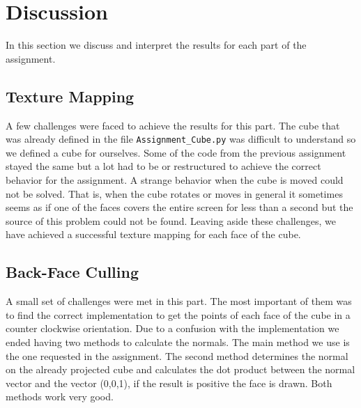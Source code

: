 \section{Discussion}
	In this section we discuss and interpret the results for each part of the assignment.
\subsection{Texture Mapping}
A few challenges were faced to achieve the results for this part. The cube that was already defined in the file \verb|Assignment_Cube.py| was difficult to understand so we defined a cube for ourselves. Some of the code from the previous assignment stayed the same but a lot had to be or restructured to achieve the correct behavior for the assignment. A strange behavior when the cube is moved could not be solved. That is, when the cube rotates or moves in general it sometimes seems as if one of the faces covers the entire screen for less than a second but the source of this problem could not be found. Leaving aside these challenges, we have achieved a successful texture mapping for each face of the cube.

\subsection{Back-Face Culling}
A small set of challenges were met in this part. The most important of them was to find the correct implementation to get the points of each face of the cube in a counter clockwise orientation. Due to a confusion with the implementation we ended having two methods to calculate the normals. The main method we use is the one requested in the assignment. The second method determines the normal on the already projected cube and calculates the dot product between the normal vector and the vector (0,0,1), if the result is positive the face is drawn. Both methods work very good.